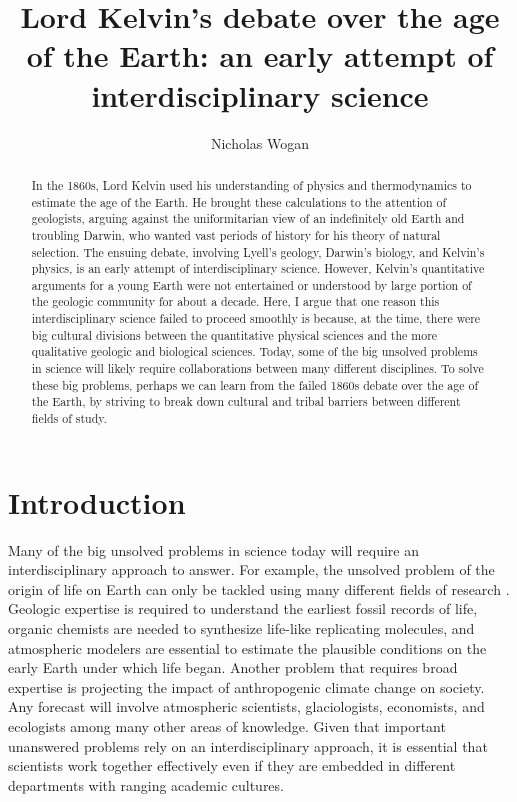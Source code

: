 \documentclass[12pt]{article}
\begin{document}
\title{Lord Kelvin's debate over the age of the Earth: an early attempt of interdisciplinary science}
\author{Nicholas Wogan}
\maketitle

\begin{abstract}
  In the 1860s, Lord Kelvin used his understanding of physics and thermodynamics to estimate the age of the Earth. He brought these calculations to the attention of geologists, arguing against the uniformitarian view of an indefinitely old Earth and troubling Darwin, who wanted vast periods of history for his theory of natural selection. The ensuing debate, involving Lyell's geology, Darwin's biology, and Kelvin's physics, is an early attempt of interdisciplinary science. However, Kelvin's quantitative arguments for a young Earth were not entertained or understood by large portion of the geologic community for about a decade. Here, I argue that one reason this interdisciplinary science failed to proceed smoothly is because, at the time, there were big cultural divisions between the quantitative physical sciences and the more qualitative geologic and biological sciences. Today, some of the big unsolved problems in science will likely require collaborations between many different disciplines. To solve these big problems, perhaps we can learn from the failed 1860s debate over the age of the Earth, by striving to break down cultural and tribal barriers between different fields of study.
\end{abstract}

\section{Introduction}


Many of the big unsolved problems in science today will require an interdisciplinary approach to answer. For example, the unsolved problem of the origin of life on Earth can only be tackled using many different fields of research \citep{Hays_2015}. Geologic expertise is required to understand the earliest fossil records of life, organic chemists are needed to synthesize life-like replicating molecules, and atmospheric modelers are essential to estimate the plausible conditions on the early Earth under which life began. Another problem that requires broad expertise is projecting the impact of anthropogenic climate change on society. Any forecast will involve atmospheric scientists, glaciologists, economists, and ecologists among many other areas of knowledge. Given that important unanswered problems rely on an interdisciplinary approach, it is essential that scientists work together effectively even if they are embedded in different departments with ranging academic cultures.
\end{document}
